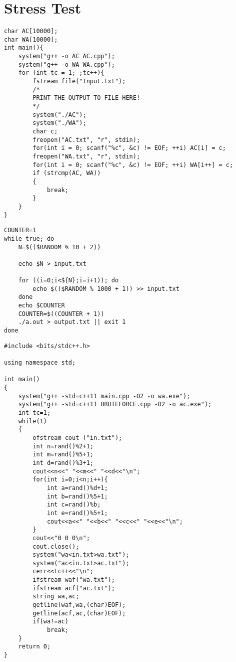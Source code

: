 \documentclass[12pt]{book}
\begin{document}
\section{Stress Test}
\begin{verbatim}
char AC[10000];
char WA[10000];
int main(){
	system("g++ -o AC AC.cpp");
	system("g++ -o WA WA.cpp");
	for (int tc = 1; ;tc++){
		fstream file("Input.txt");
		/*
		PRINT THE OUTPUT TO FILE HERE!
		*/
		system("./AC");
		system("./WA");
		char c;
		freopen("AC.txt", "r", stdin);
		for(int i = 0; scanf("%c", &c) != EOF; ++i) AC[i] = c;
		freopen("WA.txt", "r", stdin);
		for(int i = 0; scanf("%c", &c) != EOF; ++i) WA[i++] = c;
		if (strcmp(AC, WA))
		{
			break;
		}
	}
}
\end{verbatim}
\begin{verbatim}
COUNTER=1
while true; do
	N=$(($RANDOM % 10 + 2))

	echo $N > input.txt

	for ((i=0;i<${N};i=i+1)); do
		echo $(($RANDOM % 1000 + 1)) >> input.txt
	done
	echo $COUNTER
	COUNTER=$((COUNTER + 1))
	./a.out > output.txt || exit 1
done
\end{verbatim}
\begin{verbatim}
#include <bits/stdc++.h>

using namespace std;

int main()
{
    system("g++ -std=c++11 main.cpp -O2 -o wa.exe");
    system("g++ -std=c++11 BRUTEFORCE.cpp -O2 -o ac.exe");
    int tc=1;
    while(1)
    {
        ofstream cout ("in.txt");
        int n=rand()%2+1;
        int m=rand()%5+1;
        int d=rand()%3+1;
        cout<<n<<" "<<m<<" "<<d<<"\n";
        for(int i=0;i<n;i++){
            int a=rand()%d+1;
            int b=rand()%5+1;
            int c=rand()%b;
            int e=rand()%5+1;
            cout<<a<<" "<<b<<" "<<c<<" "<<e<<"\n";
        }
        cout<<"0 0 0\n";
        cout.close();
        system("wa<in.txt>wa.txt");
        system("ac<in.txt>ac.txt");
        cerr<<tc++<<"\n";
        ifstream waf("wa.txt");
        ifstream acf("ac.txt");
        string wa,ac;
        getline(waf,wa,(char)EOF);
        getline(acf,ac,(char)EOF);
        if(wa!=ac)
            break;
    }
    return 0;
}
\end{verbatim}
\end{document}
